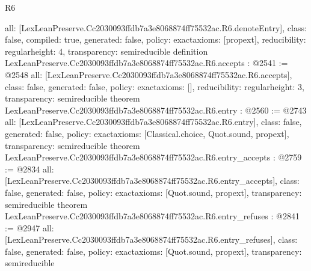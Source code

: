 \begin{lexlean}{R6}
\begin{coremodule}
{  all: [LexLeanPreserve.Cc2030093ffdb7a3e8068874ff75532ac.R6.denoteEntry],
  class: false,
  compiled: true,
  generated: false,
  policy: exact{axioms: [propext]},
  reducibility: regular{height: 4},
  transparency: semireducible
}
definition LexLeanPreserve.Cc2030093ffdb7a3e8068874ff75532ac.R6.accepts : @2541 := @2548 {
  all: [LexLeanPreserve.Cc2030093ffdb7a3e8068874ff75532ac.R6.accepts],
  class: false,
  generated: false,
  policy: exact{axioms: []},
  reducibility: regular{height: 3},
  transparency: semireducible
}
theorem LexLeanPreserve.Cc2030093ffdb7a3e8068874ff75532ac.R6.entry : @2560 := @2743 {
  all: [LexLeanPreserve.Cc2030093ffdb7a3e8068874ff75532ac.R6.entry],
  class: false,
  generated: false,
  policy: exact{axioms: [Classical.choice, Quot.sound, propext]},
  transparency: semireducible
}
theorem LexLeanPreserve.Cc2030093ffdb7a3e8068874ff75532ac.R6.entry_accepts : @2759 := @2834 {
  all: [LexLeanPreserve.Cc2030093ffdb7a3e8068874ff75532ac.R6.entry_accepts],
  class: false,
  generated: false,
  policy: exact{axioms: [Quot.sound, propext]},
  transparency: semireducible
}
theorem LexLeanPreserve.Cc2030093ffdb7a3e8068874ff75532ac.R6.entry_refuses : @2841 := @2947 {
  all: [LexLeanPreserve.Cc2030093ffdb7a3e8068874ff75532ac.R6.entry_refuses],
  class: false,
  generated: false,
  policy: exact{axioms: [Quot.sound, propext]},
  transparency: semireducible
}


\end{coremodule}
\end{lexlean}
